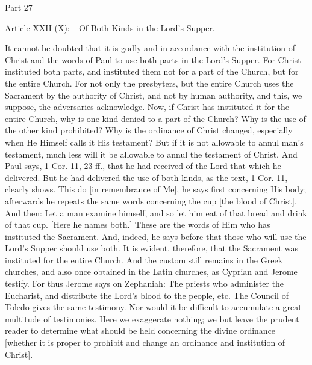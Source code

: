 Part 27


Article XXII (X): _Of Both Kinds in the Lord's Supper._

It cannot be doubted that it is godly and in accordance with the
institution of Christ and the words of Paul to use both parts in the
Lord's Supper.  For Christ instituted both parts, and instituted them
not for a part of the Church, but for the entire Church.  For not
only the presbyters, but the entire Church uses the Sacrament by the
authority of Christ, and not by human authority, and this, we suppose,
the adversaries acknowledge.  Now, if Christ has instituted it for
the entire Church, why is one kind denied to a part of the Church?
Why is the use of the other kind prohibited?  Why is the ordinance of
Christ changed, especially when He Himself calls it His testament?
But if it is not allowable to annul man's testament, much less will
it be allowable to annul the testament of Christ.  And Paul says, 1
Cor. 11, 23 ff., that he had received of the Lord that which he
delivered.  But he had delivered the use of both kinds, as the text,
1 Cor. 11, clearly shows.  This do [in remembrance of Me], he says
first concerning His body; afterwards he repeats the same words
concerning the cup [the blood of Christ].  And then: Let a man
examine himself, and so let him eat of that bread and drink of that
cup.  [Here he names both.] These are the words of Him who has
instituted the Sacrament.  And, indeed, he says before that those who
will use the Lord's Supper should use both.  It is evident, therefore,
that the Sacrament was instituted for the entire Church.  And the
custom still remains in the Greek churches, and also once obtained in
the Latin churches, as Cyprian and Jerome testify.  For thus Jerome
says on Zephaniah: The priests who administer the Eucharist, and
distribute the Lord's blood to the people, etc. The Council of Toledo
gives the same testimony.  Nor would it be difficult to accumulate a
great multitude of testimonies.  Here we exaggerate nothing; we but
leave the prudent reader to determine what should be held concerning
the divine ordinance [whether it is proper to prohibit and change an
ordinance and institution of Christ].

